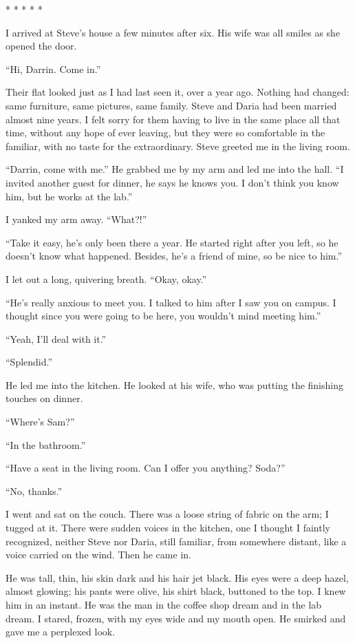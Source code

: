 \documentclass[
]{article}
\begin{document}
* * * * *

I arrived at Steve's house a few minutes after six. His wife was all
smiles as she opened the door.

``Hi, Darrin. Come in.''

Their flat looked just as I had last seen it, over a year ago. Nothing
had changed: same furniture, same pictures, same family. Steve and Daria
had been married almost nine years. I felt sorry for them having to live
in the same place all that time, without any hope of ever leaving, but
they were so comfortable in the familiar, with no taste for the
extraordinary. Steve greeted me in the living room.

``Darrin, come with me.'' He grabbed me by my arm and led me into the
hall. ``I invited another guest for dinner, he says he knows you. I
don't think you know him, but he works at the lab.''

I yanked my arm away. ``What?!''

``Take it easy, he's only been there a year. He started right after you
left, so he doesn't know what happened. Besides, he's a friend of mine,
so be nice to him.''

I let out a long, quivering breath. ``Okay, okay.''

``He's really anxious to meet you. I talked to him after I saw you on
campus. I thought since you were going to be here, you wouldn't mind
meeting him.''

``Yeah, I'll deal with it.''

``Splendid.''

He led me into the kitchen. He looked at his wife, who was putting the
finishing touches on dinner.

``Where's Sam?''

``In the bathroom.''

``Have a seat in the living room. Can I offer you anything? Soda?''

``No, thanks.''

I went and sat on the couch. There was a loose string of fabric on the
arm; I tugged at it. There were sudden voices in the kitchen, one I
thought I faintly recognized, neither Steve nor Daria, still familiar,
from somewhere distant, like a voice carried on the wind. Then he came
in.

He was tall, thin, his skin dark and his hair jet black. His eyes were a
deep hazel, almost glowing; his pants were olive, his shirt black,
buttoned to the top. I knew him in an instant. He was the man in the
coffee shop dream and in the lab dream. I stared, frozen, with my eyes
wide and my mouth open. He smirked and gave me a perplexed look.
\end{document}
